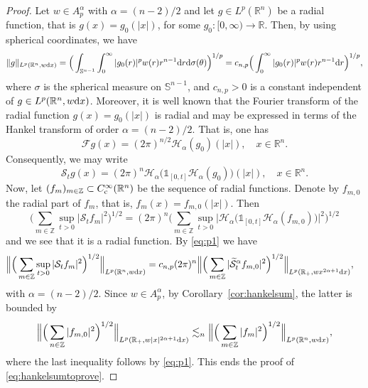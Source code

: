 \documentclass[11pt,oneside]{amsart}
\numberwithin{equation}{section}
\theoremstyle{definition}
\newcommand{\RR}{\mathbb{R}}
\newcommand{\ZZ}{\mathbb{Z}}
\newcommand{\calF}{\mathcal{F}}
\newcommand{\calH}{\mathcal{H}}
\newcommand{\calS}{\mathcal{S}}
\begin{document}
\begin{proof}
Let $w\in A_p^\alpha$ with $\alpha=(n-2)/2$ and let $g\in L^p(\RR^n)$ be a radial function, that is $g(x)=g_0(|x|)$, for some $g_0\colon[0,\infty)\to\RR$. Then, by using spherical coordinates, we have
\begin{equation}\label{eq:p1}
    \|g\|_{L^p(\RR^n,w{\rm d}x)}=\Big(\int_{\mathbb{S}^{n-1}}\int_{0}^\infty|g_0(r)|^p w(r)r^{n-1}{\rm d}r{\rm d}\sigma(\theta)\Big)^{1/p}=c_{n,p}\Big(\int_{0}^\infty|g_0(r)|^p w(r)r^{n-1}{\rm d}r\Big)^{1/p},
\end{equation}
where $\sigma$ is the spherical measure on $\mathbb{S}^{n-1}$, and $c_{n,p}>0$ is a constant independent of $g\in L^p(\RR^n, w{\rm d}x)$. Moreover, it is well known that the Fourier transform of the radial function $g(x)=g_0(|x|)$ is radial and may be expressed in terms of the Hankel transform of order $\alpha=(n-2)/2$. That is, one has
\begin{equation*}
    \calF g(x)=(2\pi)^{n/2}\calH_{\alpha}(g_0)(|x|),\quad x\in\RR^n.
\end{equation*}
Consequently, we may write
\begin{equation*}
    \calS_t g(x)=(2\pi)^n\calH_\alpha\big(\mathds{1}_{[0,t]}\calH_\alpha( g_0)\big)(|x|),\quad x\in\RR^n.
\end{equation*}
Now, let $(f_m)_{m\in\ZZ}\subset C_{\rm c}^\infty(\RR^n)$ be the sequence of radial functions. Denote by $f_{m,0}$ the radial part of $f_m$, that is, $f_m(x)=f_{m,0}(|x|)$. Then
\begin{equation*}
    \Big(\sum_{m\in\ZZ}\sup_{t>0} |\calS_t f_m|^2\Big)^{1/2}=(2\pi)^n\Big(\sum_{m\in\ZZ}\sup_{t>0} \big|\calH_\alpha\big(\mathds{1}_{[0,t]}\calH_\alpha( f_{m,0})\big)\big|^2\Big)^{1/2}
\end{equation*}
and we see that it is a radial function. By \eqref{eq:p1} we have 
\begin{align*}
    \Big\|\Big(\sum_{m\in\ZZ}\sup_{t>0} |\calS_t f_m|^2\Big)^{1/2}\Big\|_{L^p(\RR^n,w{\rm d}x)}&=c_{n,p}(2\pi)^n\Big\|\Big(\sum_{m\in\ZZ}|\widetilde{\calS}_{t}^\alpha f_{m,0}|^2\Big)^{1/2}\Big\|_{L^p(\RR_+,wx^{2\alpha+1}{\rm d}x)},
\end{align*}
with $\alpha=(n-2)/2$. Since $w\in A_p^\alpha$, by Corollary~\ref{cor:hankelsum}, the latter is bounded by
\begin{equation*}
\Big\|\Big(\sum_{n\in\ZZ}|f_{m,0}|^2\Big)^{1/2}\Big\|_{L^p(\RR_+,w|x|^{2\alpha+1}{\rm d}x)}\lesssim_n\Big\|\Big(\sum_{m\in\ZZ}|f_m|^2\Big)^{1/2}\Big\|_{L^p(\RR^n,w{\rm d}x)},
\end{equation*}
where the last inequality follows by \eqref{eq:p1}. This ends the proof of \eqref{eq:hankelsumtoprove}.
\end{proof}
\end{document}
